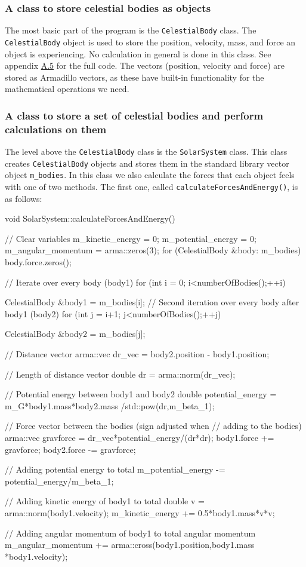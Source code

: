 \documentclass[reprint,english,notitlepage]{revtex4-1}  %
\begin{document}
\subsubsection{A class to store celestial bodies as objects} \label{sec:III:a:1}

The most basic part of the program is the \verb+CelestialBody+ class. The \verb+CelestialBody+ object is used to store the position, velocity, mass, and force an object is experiencing. No calculation in general is done in this class. See appendix \hyperref[A.5]{A.5} for the full code. The vectors (position, velocity and force) are stored as Armadillo \citep{Armadillo} vectors, as these have built-in functionality for the mathematical operations we need.

\subsubsection{A class to store a set of celestial bodies and perform calculations on them} \label{sec:III:a:2}

The level above the \verb+CelestialBody+ class is the \verb+SolarSystem+ class. This class creates \verb+CelestialBody+ objects and stores them in the standard library vector object \verb+m_bodies+. In this class we also calculate the forces that each object feels with one of two methods. The first one, called \verb+calculateForcesAndEnergy()+, is as follows:

\begin{cpp}
void SolarSystem::calculateForcesAndEnergy() {
  // Clear variables
  m_kinetic_energy = 0;
  m_potential_energy = 0;
  m_angular_momentum = arma::zeros(3);
  for (CelestialBody &body: m_bodies) {
    body.force.zeros();
  }

  // Iterate over every body (body1)
  for (int i = 0; i<numberOfBodies();++i){
    CelestialBody &body1 = m_bodies[i];
    // Second iteration over every body after body1 (body2)
    for (int j = i+1; j<numberOfBodies();++j) {
      CelestialBody &body2 = m_bodies[j];

      // Distance vector
      arma::vec dr_vec = body2.position - body1.position;

      // Length of distance vector
      double dr = arma::norm(dr_vec);

      // Potential energy between body1 and body2
      double potential_energy = m_G*body1.mass*body2.mass
      							/std::pow(dr,m_beta_1);

      // Force vector between the bodies (sign adjusted when
      // adding to the bodies)
      arma::vec gravforce = dr_vec*potential_energy/(dr*dr);
      body1.force += gravforce;
      body2.force -= gravforce;

      // Adding potential energy to total
      m_potential_energy -= potential_energy/m_beta_1;
    }

    // Adding kinetic energy of body1 to total
    double v = arma::norm(body1.velocity);
    m_kinetic_energy += 0.5*body1.mass*v*v;

    // Adding angular momentum of body1 to total angular momentum
    m_angular_momentum += arma::cross(body1.position,body1.mass
    								  *body1.velocity);
  }
}
\end{cpp}
\end{document}
